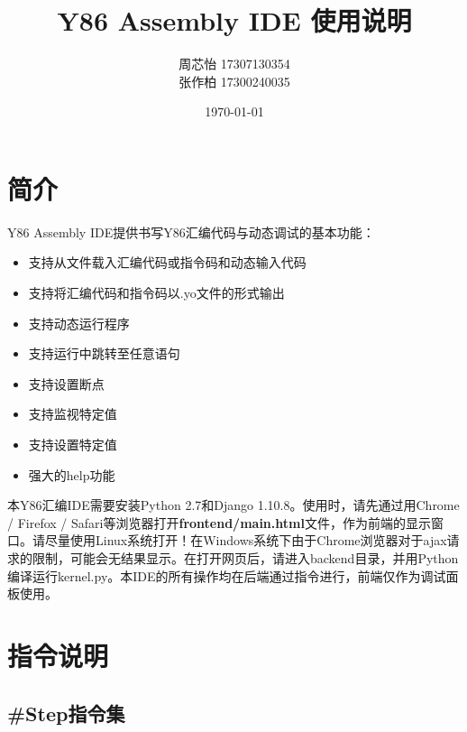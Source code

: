 \documentclass[12pt]{article} %
\title{\textbf{Y86 Assembly IDE 使用说明}}
\author{周芯怡 17307130354\\张作柏 17300240035}
\date{\today}
\begin{document}
\begin{sloppypar}
\maketitle

\section{简介}

Y86 Assembly IDE提供书写Y86汇编代码与动态调试的基本功能：
\begin{itemize}
\item 支持从文件载入汇编代码或指令码和动态输入代码
\item 支持将汇编代码和指令码以.yo文件的形式输出
\item 支持动态运行程序
\item 支持运行中跳转至任意语句
\item 支持设置断点
\item 支持监视特定值
\item 支持设置特定值
\item 强大的help功能
\end{itemize}

本Y86汇编IDE需要安装Python 2.7和Django 1.10.8。使用时，请先通过用Chrome / Firefox / Safari等浏览器打开{\bf frontend/main.html}文件，作为前端的显示窗口。请尽量使用Linux系统打开！在Windows系统下由于Chrome浏览器对于ajax请求的限制，可能会无结果显示。在打开网页后，请进入backend目录，并用Python编译运行kernel.py。本IDE的所有操作均在后端通过指令进行，前端仅作为调试面板使用。

\clearpage
\section{指令说明}

\subsection{\#Step指令集}


\end{sloppypar}
\end{document}

